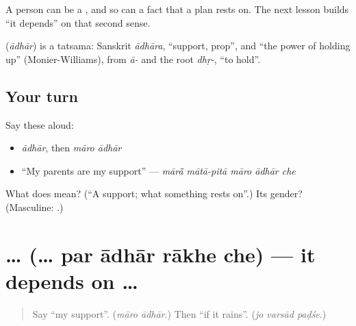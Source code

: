 A person can be a \textbf{}, and so can a fact that a plan rests on. The next lesson builds \textquotedblleft{}it depends\textquotedblright{} on that second sense.

\begin{cousinweb}
\textbf{} (\emph{ādhār}) is a tatsama: Sanskrit \emph{ādhāra}, \textquotedblleft{}support, prop\textquotedblright{}, and \textquotedblleft{}the power of holding up\textquotedblright{} (Monier-Williams), from \emph{ā-} and the root \emph{dhṛ-}, \textquotedblleft{}to hold\textquotedblright{}.
\end{cousinweb}

\subsection*{Your turn}
Say these aloud:

\begin{itemize}
\raggedright
  \item \emph{ādhār}, then \emph{māro ādhār}
  \item \textquotedblleft{}My parents are my support\textquotedblright{} — \emph{mārā̃ mātā-pitā māro ādhār che}
\end{itemize}

\begin{tcolorbox}[breakable,colback=teal!4,colframe=teal!35!black,title={Before you move on}]
What does \textbf{} mean? (\textquotedblleft{}A support; what something rests on\textquotedblright{}.) Its gender? (Masculine: \textbf{ }.)
\end{tcolorbox}
\section[\texorpdfstring{… \gu{પર} \gu{આધાર} \gu{રાખે} \gu{છે} (… par ādhār rākhe che)}{… પર આધાર રાખે છે (… par ādhār rākhe che)}]{…     (… par ādhār rākhe che) — it depends on …}

\label{lesson:GU-C284-adhar-rakhe-che}



\begin{quote}
Say \textquotedblleft{}my support\textquotedblright{}. (\emph{māro ādhār}.) Then \textquotedblleft{}if it rains\textquotedblright{}. (\emph{jo varsād paḍśe}.)
\end{quote}

